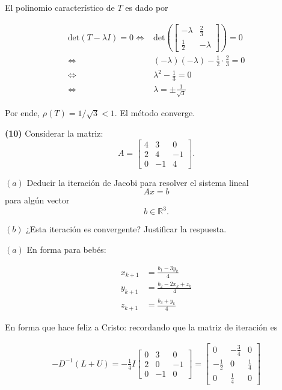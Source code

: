 \documentclass[12pt]{article}
\begin{document}
El polinomio característico de $T$ es dado por 

\begin{align*}
    \text{det}(T - \lambda I) = 0 
    \iff &\text{det}\left(\begin{bmatrix} 
        -\lambda & \frac{2}{3} \\ 
        \frac{1}{2} & -\lambda
    \end{bmatrix} \right) = 0\\ 
    \iff 
         &(-\lambda)(-\lambda) - \frac{1}{2} \cdot \frac{2}{3} = 0 \\ 
         \iff 
         &\lambda^2 -\frac{1}{3} = 0 \\ 
         \iff 
        &\lambda = \pm \frac{1}{\sqrt{3} }
\end{align*}

Por ende, $\rho(T) = 1 / \sqrt{3} < 1 $. El método converge.

\pagebreak 

\begin{myframe}
\textbf{(10)} Considerar la matriz:
\[
A=
\begin{bmatrix}
4 & 3 & 0\\
2 & 4 & -1\\
0 & -1 & 4
\end{bmatrix}.
\]

$(a)$ Deducir la iteración de Jacobi para resolver el sistema lineal
\[
Ax=b
\]
para algún vector
\[
b\in\mathbb{R}^3.
\]

$(b)$ ¿Esta iteración es convergente? Justificar la respuesta.
\end{myframe}

$(a)$ En forma para bebés:

\begin{align*}
    x_{k+1} &= \frac{b_1 - 3y_k}{4} \\ 
    y_{k+1} &= \frac{b_2 -2x_k + z_k}{4}\\ 
    z_{k+1} &= \frac{b_3 + y_k}{4}
\end{align*}

En forma que hace feliz a Cristo: recordando que la matriz de iteración es 

\begin{align*}
    -D^{-1}(L+U) = 
    -\frac{1}{4} I 
    \begin{bmatrix} 
        0 & 3 & 0 \\ 
        2 & 0 & -1 \\ 
        0 & -1 & 0
    \end{bmatrix} = \begin{bmatrix} 
        0 & -\frac{3}{4} & 0 \\ 
        -\frac{1}{2} & 0 & \frac{1}{4}\\ 
        0 & \frac{1}{4} &0
    \end{bmatrix} 
\end{align*}
\end{document}
